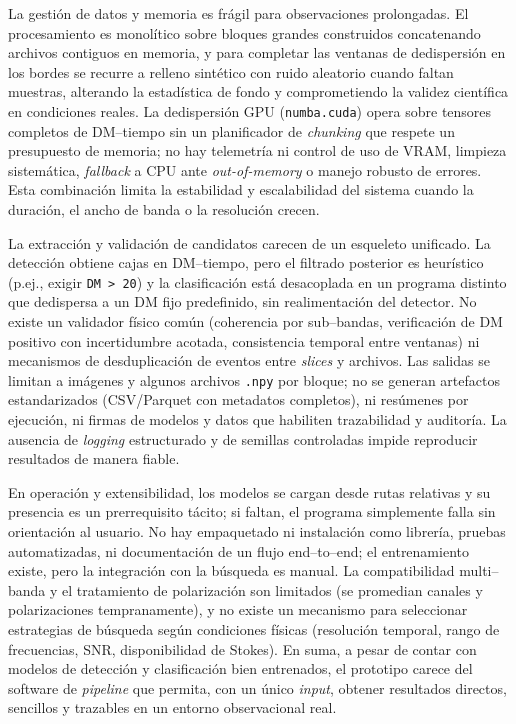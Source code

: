 La gestión de datos y memoria es frágil para observaciones prolongadas. El procesamiento es monolítico sobre bloques grandes construidos concatenando archivos contiguos en memoria, y para completar las ventanas de dedispersión en los bordes se recurre a relleno sintético con ruido aleatorio cuando faltan muestras, alterando la estadística de fondo y comprometiendo la validez científica en condiciones reales. La dedispersión GPU (\texttt{numba.cuda}) opera sobre tensores completos de DM--tiempo sin un planificador de \textit{chunking} que respete un presupuesto de memoria; no hay telemetría ni control de uso de VRAM, limpieza sistemática, \textit{fallback} a CPU ante \emph{out-of-memory} o manejo robusto de errores. Esta combinación limita la estabilidad y escalabilidad del sistema cuando la duración, el ancho de banda o la resolución crecen.

La extracción y validación de candidatos carecen de un esqueleto unificado. La detección obtiene cajas en DM--tiempo, pero el filtrado posterior es heurístico (p.ej., exigir \texttt{DM > 20}) y la clasificación está desacoplada en un programa distinto que dedispersa a un DM fijo predefinido, sin realimentación del detector. No existe un validador físico común (coherencia por sub--bandas, verificación de DM positivo con incertidumbre acotada, consistencia temporal entre ventanas) ni mecanismos de desduplicación de eventos entre \emph{slices} y archivos. Las salidas se limitan a imágenes y algunos archivos \texttt{.npy} por bloque; no se generan artefactos estandarizados (CSV/Parquet con metadatos completos), ni resúmenes por ejecución, ni firmas de modelos y datos que habiliten trazabilidad y auditoría. La ausencia de \emph{logging} estructurado y de semillas controladas impide reproducir resultados de manera fiable.

En operación y extensibilidad, los modelos se cargan desde rutas relativas y su presencia es un prerrequisito tácito; si faltan, el programa simplemente falla sin orientación al usuario. No hay empaquetado ni instalación como librería, pruebas automatizadas, ni documentación de un flujo end--to--end; el entrenamiento existe, pero la integración con la búsqueda es manual. La compatibilidad multi--banda y el tratamiento de polarización son limitados (se promedian canales y polarizaciones tempranamente), y no existe un mecanismo para seleccionar estrategias de búsqueda según condiciones físicas (resolución temporal, rango de frecuencias, SNR, disponibilidad de Stokes). En suma, a pesar de contar con modelos de detección y clasificación bien entrenados, el prototipo carece del software de \emph{pipeline} que permita, con un único \emph{input}, obtener resultados directos, sencillos y trazables en un entorno observacional real.

